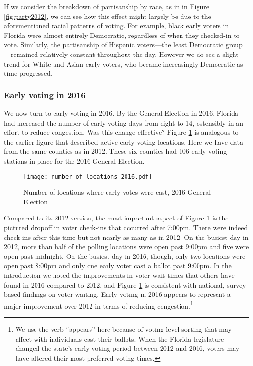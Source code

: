 \documentclass[12pt,titlepage]{article}
\begin{document}

If we consider the breakdown of partisanship by race, as in in Figure
\ref{fig:party2012}, we can see how this effect might largely be due
to the aforementioned racial patterns of voting.  For example, black
early voters in Florida were almost entirely Democratic, regardless of
when they checked-in to vote.  Similarly, the partisanship of Hispanic
voters---the least Democratic group---remained relatively constant
throughout the day.  However we do see a slight trend for White and
Asian early voters, who became increasingly Democratic as time
progressed.


\subsubsection*{Early voting in 2016}

We now turn to early voting in 2016.  By the General Election in 2016,
Florida had increased the number of early voting days from eight to
14, ostensibly in an effort to reduce congestion. Was this change
effective?  Figure \ref{fig:nrlocs2016} is analogous to the earlier
figure that described active early voting locations.  Here we have
data from the same counties as in 2012.  These six counties had 106
early voting stations in place for the 2016 General Election.


\begin{figure}[!ht]
  \caption{Number of locations where early votes were cast, 2016 General
    Election}
  \label{fig:nrlocs2016}
  \centering
    \centering\texttt{[image: number\_of\_locations\_2016.pdf]}
\end{figure}

Compared to its 2012 version, the most important aspect of Figure
\ref{fig:nrlocs2016} is the pictured dropoff in voter check-ins that
occurred after 7:00pm.  There were indeed check-ins after this time
but not nearly as many as in 2012.  On the busiest day in 2012, more
than half of the polling locations were open past 9:00pm and five were
open past midnight.  On the busiest day in 2016, though, only two
locations were open past 8:00pm and only one early voter cast a ballot
past 9:00pm.  In the introduction we noted the improvements in voter
wait times that others have found in 2016 compared to 2012, and Figure
\ref{fig:nrlocs2016} is consistent with national, survey-based
findings on voter waiting.  Early voting in 2016 appears to represent
a major improvement over 2012 in terms of reducing
congestion.\footnote{We use the verb ``appears'' here because of
  voting-level sorting that may affect with individuals cast their
  ballots.  When the Florida legislature changed the state's early
  voting period between 2012 and 2016, voters may have altered their
  most preferred voting times.}
\end{document}
